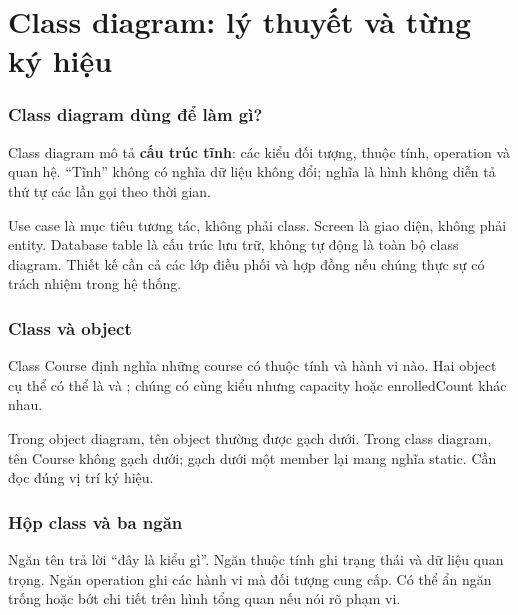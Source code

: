 \chapter{Class diagram: lý thuyết và từng ký hiệu}
\subsection{Class diagram dùng để làm gì?}
Class diagram mô tả \textbf{cấu trúc tĩnh}: các kiểu đối tượng, thuộc tính, operation và quan hệ. ``Tĩnh'' không có nghĩa dữ liệu không đổi; nghĩa là hình không diễn tả thứ tự các lần gọi theo thời gian.

Use case là mục tiêu tương tác, không phải class. Screen là giao diện, không phải entity. Database table là cấu trúc lưu trữ, không tự động là toàn bộ class diagram. Thiết kế cần cả các lớp điều phối và hợp đồng nếu chúng thực sự có trách nhiệm trong hệ thống.

\subsection{Class và object}
Class Course định nghĩa những course có thuộc tính và hành vi nào. Hai object cụ thể có thể là  và ; chúng có cùng kiểu nhưng capacity hoặc enrolledCount khác nhau.

Trong object diagram, tên object thường được gạch dưới. Trong class diagram, tên Course không gạch dưới; gạch dưới một member lại mang nghĩa static. Cần đọc đúng vị trí ký hiệu.

\subsection{Hộp class và ba ngăn}
Ngăn tên trả lời ``đây là kiểu gì''. Ngăn thuộc tính ghi trạng thái và dữ liệu quan trọng. Ngăn operation ghi các hành vi mà đối tượng cung cấp. Có thể ẩn ngăn trống hoặc bớt chi tiết trên hình tổng quan nếu nói rõ phạm vi.

